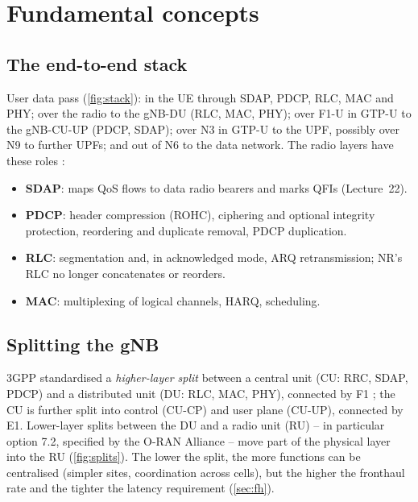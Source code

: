\documentclass[11pt,a4paper]{article}
\begin{document}
\section{Fundamental concepts}

\subsection{The end-to-end stack}
User data pass (\cref{fig:stack}): in the UE through SDAP, PDCP, RLC, MAC and PHY; over the radio to the gNB-DU (RLC, MAC, PHY); over
F1-U in GTP-U to the gNB-CU-UP (PDCP, SDAP); over N3 in GTP-U to the UPF, possibly over N9 to further UPFs; and out of N6 to the data
network. The radio layers have these roles \cite{ts38300}:
\begin{itemize}
  \item \textbf{SDAP}: maps QoS flows to data radio bearers and marks QFIs (Lecture~22).
  \item \textbf{PDCP}: header compression (ROHC), ciphering and optional integrity protection, reordering and duplicate removal, PDCP
        duplication.
  \item \textbf{RLC}: segmentation and, in acknowledged mode, ARQ retransmission; NR's RLC no longer concatenates or reorders.
  \item \textbf{MAC}: multiplexing of logical channels, HARQ, scheduling.
\end{itemize}

\begin{acnfigure}
  \caption{5G user-plane protocol stack with a split gNB (CU-UP and DU).}
  \label{fig:stack}
\end{acnfigure}

\subsection{Splitting the gNB}
3GPP standardised a \emph{higher-layer split} between a central unit (CU: RRC, SDAP, PDCP) and a distributed unit (DU: RLC, MAC, PHY),
connected by F1 \cite{ts38401}; the CU is further split into control (CU-CP) and user plane (CU-UP), connected by E1. Lower-layer splits
between the DU and a radio unit (RU) -- in particular option 7.2, specified by the O-RAN Alliance -- move part of the physical layer into
the RU (\cref{fig:splits}). The lower the split, the more functions can be centralised (simpler sites, coordination across cells), but the
higher the fronthaul rate and the tighter the latency requirement (\cref{sec:fh}).
\end{document}
